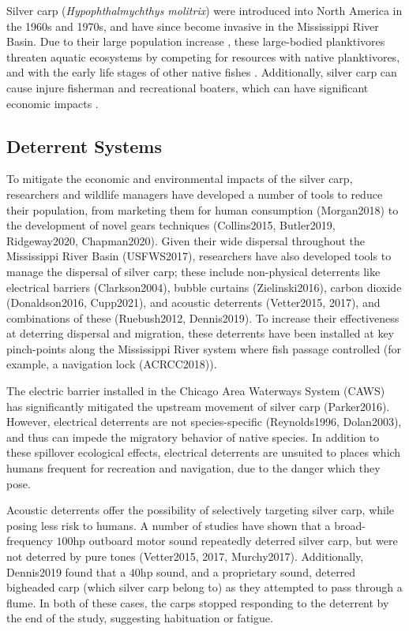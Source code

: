 \documentclass[12pt]{article}
\begin{document}
	Silver carp (\emph{Hypophthalmychthys molitrix}) were introduced into North America in the 1960s and 1970s, and have since become invasive in the Mississippi River Basin. Due to their large population increase \cite{DeBoer2018}, these large-bodied planktivores threaten aquatic ecosystems \cite{Kolar2007, Pegg2002, Sullivan2018} by competing for resources with native planktivores, and with the early life stages of other native fishes \cite{Solomon2016, Phelps2017, Fritts2018}.  Additionally, silver carp can cause injure fisherman and recreational boaters, which can have significant economic impacts \cite{Solomon2016, Chick2020}.

	\subsection{Deterrent Systems}

	To mitigate the economic and environmental impacts of the silver carp, researchers and wildlife managers have developed a number of tools to reduce their population, from marketing them for human consumption (Morgan2018) to the development of novel gears techniques (Collins2015, Butler2019, Ridgeway2020, Chapman2020). Given their wide dispersal throughout the Mississippi River Basin (USFWS2017), researchers have also developed tools to manage the dispersal of silver carp; these include non-physical deterrents like electrical barriers (Clarkson2004), bubble curtains (Zielinski2016), carbon dioxide (Donaldson2016, Cupp2021), and acoustic deterrents (Vetter2015, 2017), and combinations of these (Ruebush2012, Dennis2019). To increase their effectiveness at deterring dispersal and migration, these deterrents have been installed at key pinch-points along the Mississippi River system  where fish passage controlled (for example, a navigation lock (ACRCC2018)).
	
	The electric barrier installed in the Chicago Area Waterways System (CAWS) has significantly mitigated the upstream movement of silver carp (Parker2016). However, electrical deterrents are not species-specific (Reynolds1996, Dolan2003), and thus can impede the migratory behavior of native species. In addition to these spillover ecological effects, electrical deterrents are unsuited to places which humans frequent for recreation and navigation, due to the danger which they pose.
	
	Acoustic deterrents offer the possibility of selectively targeting silver carp, while posing less risk to humans. A number of studies have shown that a broad-frequency $100$hp outboard motor sound repeatedly deterred silver carp, but were not deterred by pure tones (Vetter2015, 2017, Murchy2017). Additionally, Dennis2019 found that a $40$hp sound, and a proprietary sound, deterred bigheaded carp (which silver carp belong to) as they attempted to pass through a flume. In both of these cases, the carps stopped responding to the deterrent by the end of the study, suggesting habituation or fatigue.
	
\end{document}
